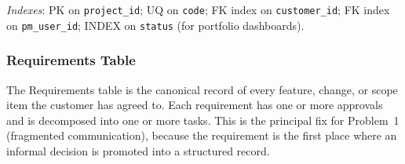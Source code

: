 \documentclass[12pt,a4paper]{report}
\begin{document}
\noindent \emph{Indexes}: PK on \texttt{project\_id}; UQ on \texttt{code}; FK
index on \texttt{customer\_id}; FK index on \texttt{pm\_user\_id}; INDEX on
\texttt{status} (for portfolio dashboards).

\subsubsection{Requirements Table}
\label{tab:requirements}

The Requirements table is the canonical record of every feature, change, or
scope item the customer has agreed to. Each requirement has one or more
approvals and is decomposed into one or more tasks. This is the principal
fix for Problem~1 (fragmented communication), because the requirement is the
first place where an informal decision is promoted into a structured record.
\end{document}
